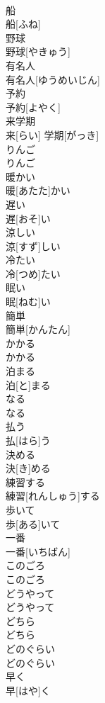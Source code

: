 \documentclass[8pt]{extreport}
\begin{document}
\begin{CJK}{UTF8}{min}
\\	船	
\\	船[ふね]
\\	野球	
\\	野球[やきゅう]
\\	有名人	
\\	有名人[ゆうめいじん]
\\	予約	
\\	予約[よやく]
\\	来学期	
\\	来[らい] 学期[がっき]
\\	りんご	
\\	りんご
\\	暖かい	
\\	暖[あたた]かい
\\	遅い	
\\	遅[おそ]い
\\	涼しい	
\\	涼[すず]しい
\\	冷たい	
\\	冷[つめ]たい
\\	眠い	
\\	眠[ねむ]い
\\	簡単	
\\	簡単[かんたん]
\\	かかる	
\\	かかる
\\	泊まる	
\\	泊[と]まる
\\	なる	
\\	なる
\\	払う	
\\	払[はら]う
\\	決める	
\\	決[き]める
\\	練習する	
\\	練習[れんしゅう]する
\\	歩いて	
\\	歩[ある]いて
\\	一番	
\\	一番[いちばん]
\\	このごろ	
\\	このごろ
\\	どうやって	
\\	どうやって
\\	どちら	
\\	どちら
\\	どのぐらい	
\\	どのぐらい
\\	早く	
\\	早[はや]く

\end{CJK}
\end{document}
